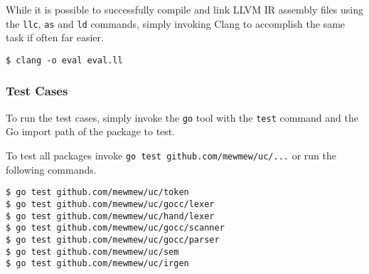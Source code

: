 While it is possible to successfully compile and link LLVM IR assembly files using the \texttt{llc}, \texttt{as} and \texttt{ld} commands, simply invoking Clang to accomplish the same task if often far easier.

\begin{verbatim}
$ clang -o eval eval.ll
\end{verbatim}

\subsubsection{Test Cases}
\label{sec:irgen_test_cases}

To run the test cases, simply invoke the \texttt{go} tool with the \texttt{test} command and the Go import path of the package to test.

To test all packages invoke \texttt{go test github.com/mewmew/uc/...} or run the following commands.

\begin{verbatim}
$ go test github.com/mewmew/uc/token
$ go test github.com/mewmew/uc/gocc/lexer
$ go test github.com/mewmew/uc/hand/lexer
$ go test github.com/mewmew/uc/gocc/scanner
$ go test github.com/mewmew/uc/gocc/parser
$ go test github.com/mewmew/uc/sem
$ go test github.com/mewmew/uc/irgen
\end{verbatim}
